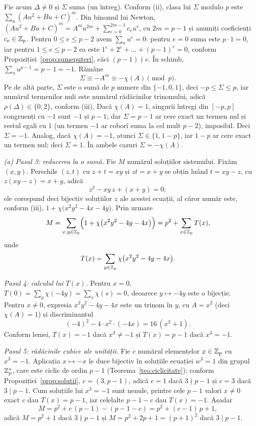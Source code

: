 \begin{solutie}
Fie acum $\Delta \neq 0$ și $\Sigma$ suma (un întreg). Conform (ii), clasa lui $\Sigma$ modulo $p$ este $\sum_{u} (Au^2 + Bu + C)^{m}$. Din binomul lui Newton, $(Au^2 + Bu + C)^m = A^m u^{2m} + \sum_{e=0}^{2m-1} c_e u^e$, cu $2m = p-1$ și anumiți coeficienți $c_e \in \mathbb{Z}_p$. Pentru $0 \le e \le p-2$ avem $\sum_{u} u^{e} = 0$: pentru $e = 0$ suma este $p \cdot 1 = 0$, iar pentru $1 \le e \le p-2$ ea este $1^e + 2^e + \dots + (p-1)^e = 0$, conform Propoziției~\ref{prop:sumeputeri}, căci $(p-1) \nmid e$. În schimb, $\sum_u u^{p-1} = p - 1 = -1$. Rămâne
\[
  \Sigma \equiv -A^m \equiv -\chi(A) \pmod p .
\]
Pe de altă parte, $\Sigma$ este o sumă de $p$ numere din $\{-1, 0, 1\}$, deci $-p \le \Sigma \le p$, iar numărul termenilor nuli este numărul rădăcinilor trinomului, adică $\rho(\Delta) \in \{0, 2\}$, conform (iii). Dacă $\chi(A) = 1$, singurii întregi din $[-p, p]$ congruenți cu $-1$ sunt $-1$ și $p - 1$; dar $\Sigma = p - 1$ ar cere exact un termen nul și restul egali cu $1$ (un termen $-1$ ar coborî suma la cel mult $p-2$), imposibil. Deci $\Sigma = -1$. Analog, dacă $\chi(A) = -1$, atunci $\Sigma \in \{1, 1-p\}$, iar $1-p$ ar cere exact un termen nul; deci $\Sigma = 1$. În ambele cazuri $\Sigma = -\chi(A)$.

\emph{(a) Pasul 3: reducerea la o sumă.} Fie $M$ numărul soluțiilor sistemului. Fixăm $(x,y)$. Perechile $(z,t)$ cu $z + t = xy$ și $zt = x + y$ se obțin luând $t = xy - z$, cu $z(xy - z) = x + y$, adică
\[
  z^2 - xy\,z + (x+y) = 0 ;
\]
ele corespund deci bijectiv soluțiilor $z$ ale acestei ecuații, al căror număr este, conform (iii), $1 + \chi\bigl(x^2y^2 - 4x - 4y\bigr)$. Prin urmare
\[
  M = \sum_{x, y \in \mathbb{Z}_p} \Bigl(1 + \chi\bigl(x^2y^2 - 4y - 4x\bigr)\Bigr) = p^2 + \sum_{x \in \mathbb{Z}_p} T(x),
\]
unde
\[
  T(x) = \sum_{y \in \mathbb{Z}_p} \chi\bigl(x^2y^2 - 4y - 4x\bigr).
\]

\emph{Pasul 4: calculul lui $T(x)$.} Pentru $x = 0$, $T(0) = \sum_{y} \chi(-4y) = \sum_{s} \chi(s) = 0$, deoarece $y \mapsto -4y$ este o bijecție. Pentru $x \neq 0$, expresia $x^2y^2 - 4y - 4x$ este un trinom în $y$, cu $A = x^2$ (deci $\chi(A) = 1$) și discriminantul
\[
  (-4)^2 - 4 \cdot x^2 \cdot (-4x) = 16\,(x^3 + 1).
\]
Conform lemei, $T(x) = -1$ dacă $x^3 \neq -1$ și $T(x) = p - 1$ dacă $x^3 = -1$.

\emph{Pasul 5: rădăcinile cubice ale unității.} Fie $c$ numărul elementelor $x \in \mathbb{Z}_p$ cu $x^3 = -1$. Aplicația $x \mapsto -x$ le duce bijectiv în soluțiile ecuației $w^3 = 1$ din grupul $\mathbb{Z}_p^*$, care este ciclic de ordin $p-1$ (Teorema~\ref{teo:ciclicitate}); conform Propoziției~\ref{prop:solutii}, $c = (3, p-1)$, adică $c = 1$ dacă $3 \nmid p - 1$ și $c = 3$ dacă $3 \mid p-1$. Cum soluțiile lui $x^3 = -1$ sunt nenule, printre cele $p - 1$ valori $x \neq 0$ exact $c$ dau $T(x) = p-1$, iar celelalte $p - 1 - c$ dau $T(x) = -1$. Așadar
\[
  M = p^2 + c\,(p-1) - (p - 1 - c) = p^2 + (c-1)\,p + 1 ,
\]
adică $M = p^2 + 1$ dacă $3 \nmid p - 1$ și $M = p^2 + 2p + 1 = (p+1)^2$ dacă $3 \mid p - 1$.


\end{solutie}
